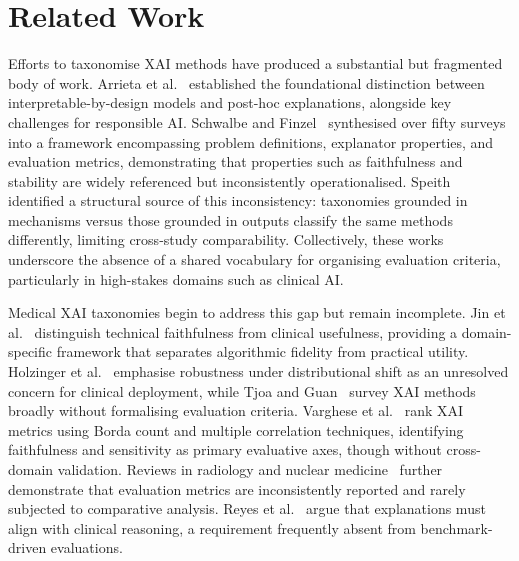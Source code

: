 \section{Related Work}

Efforts to taxonomise XAI methods have produced a substantial but fragmented
body of work. Arrieta et al.~\cite{Arrieta2020XAI} established the foundational
distinction between interpretable-by-design models and post-hoc explanations,
alongside key challenges for responsible AI. Schwalbe and
Finzel~\cite{schwalbe2024comprehensive} synthesised over fifty surveys into a
framework encompassing problem definitions, explanator properties, and evaluation
metrics, demonstrating that properties such as faithfulness and stability are
widely referenced but inconsistently operationalised. Speith~\cite{speith2022review}
identified a structural source of this inconsistency: taxonomies grounded in
mechanisms versus those grounded in outputs classify the same methods
differently, limiting cross-study comparability. Collectively, these works
underscore the absence of a shared vocabulary for organising evaluation
criteria, particularly in high-stakes domains such as clinical AI.

Medical XAI taxonomies begin to address this gap but remain incomplete.
Jin et al.~\cite{jin2023guidelines} distinguish technical faithfulness from
clinical usefulness, providing a domain-specific framework that separates
algorithmic fidelity from practical utility.
Holzinger et al.~\cite{holzinger2022information} emphasise robustness under
distributional shift as an unresolved concern for clinical deployment, while Tjoa and
Guan~\cite{Tjoa2021MedicalXAI} survey XAI methods broadly without formalising
evaluation criteria. Varghese et al.~\cite{Varghese2025OnDE} rank XAI metrics
using Borda count and multiple correlation techniques,
identifying faithfulness and sensitivity as primary evaluative axes, though
without cross-domain validation. Reviews in radiology and nuclear
medicine~\cite{groen2022systematic,de2023explainable,saw2025current} further
demonstrate that evaluation metrics are inconsistently reported and rarely
subjected to comparative analysis. Reyes et al.~\cite{reyes2020interpretability}
argue that explanations must align with clinical reasoning, a requirement
frequently absent from benchmark-driven evaluations.

